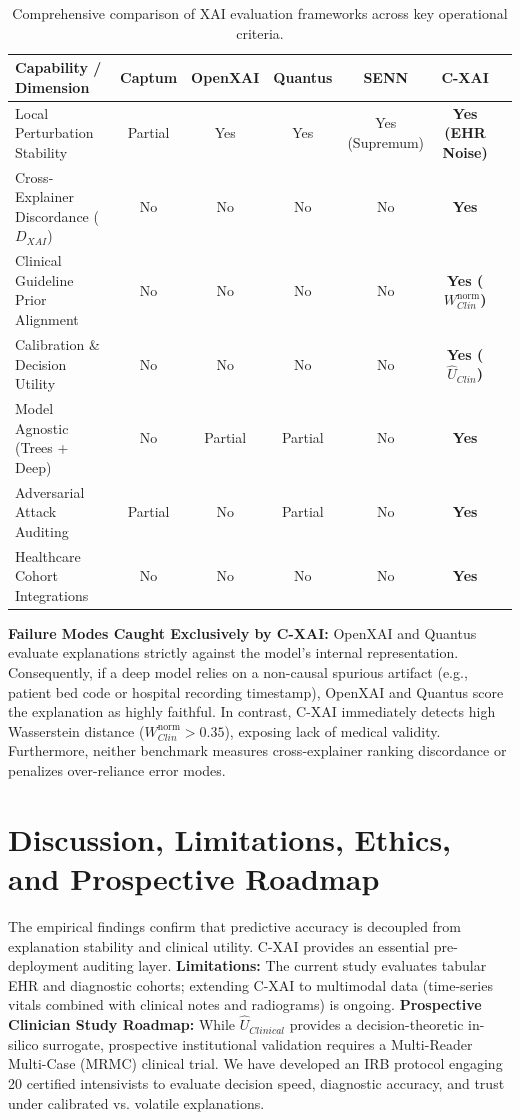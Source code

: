 \documentclass[3p,times,procedia]{elsarticle}
\theoremstyle{definition}
\begin{document}
\begin{table}[h]
\centering
\scriptsize
\caption{Comprehensive comparison of XAI evaluation frameworks across key operational criteria.}
\label{tab:framework_comparison}
\begin{tabular}{lcccccc}
\toprule
\textbf{Capability / Dimension} & \textbf{Captum} & \textbf{OpenXAI} & \textbf{Quantus} & \textbf{SENN} & \textbf{C-XAI} \\
\midrule
Local Perturbation Stability & Partial & Yes & Yes & Yes (Supremum) & \textbf{Yes (EHR Noise)} \\
Cross-Explainer Discordance ($D_{XAI}$) & No & No & No & No & \textbf{Yes} \\
Clinical Guideline Prior Alignment & No & No & No & No & \textbf{Yes ($W_{Clin}^{\mathrm{norm}}$)} \\
Calibration \& Decision Utility & No & No & No & No & \textbf{Yes ($\widehat{U}_{Clin}$)} \\
Model Agnostic (Trees + Deep) & No & Partial & Partial & No & \textbf{Yes} \\
Adversarial Attack Auditing & Partial & No & Partial & No & \textbf{Yes} \\
Healthcare Cohort Integrations & No & No & No & No & \textbf{Yes} \\
\bottomrule
\end{tabular}
\end{table}

\textbf{Failure Modes Caught Exclusively by C-XAI:}  
OpenXAI and Quantus evaluate explanations strictly against the model's internal representation. Consequently, if a deep model relies on a non-causal spurious artifact (e.g., patient bed code or hospital recording timestamp), OpenXAI and Quantus score the explanation as highly faithful. In contrast, C-XAI immediately detects high Wasserstein distance ($W_{Clin}^{\mathrm{norm}} > 0.35$), exposing lack of medical validity. Furthermore, neither benchmark measures cross-explainer ranking discordance or penalizes over-reliance error modes.

\section{Discussion, Limitations, Ethics, and Prospective Roadmap}

The empirical findings confirm that predictive accuracy is decoupled from explanation stability and clinical utility. C-XAI provides an essential pre-deployment auditing layer.  
\textbf{Limitations:} The current study evaluates tabular EHR and diagnostic cohorts; extending C-XAI to multimodal data (time-series vitals combined with clinical notes and radiograms) is ongoing.  
\textbf{Prospective Clinician Study Roadmap:} While $\widehat{U}_{Clinical}$ provides a decision-theoretic in-silico surrogate, prospective institutional validation requires a Multi-Reader Multi-Case (MRMC) clinical trial. We have developed an IRB protocol engaging 20 certified intensivists to evaluate decision speed, diagnostic accuracy, and trust under calibrated vs. volatile explanations.
\end{document}
